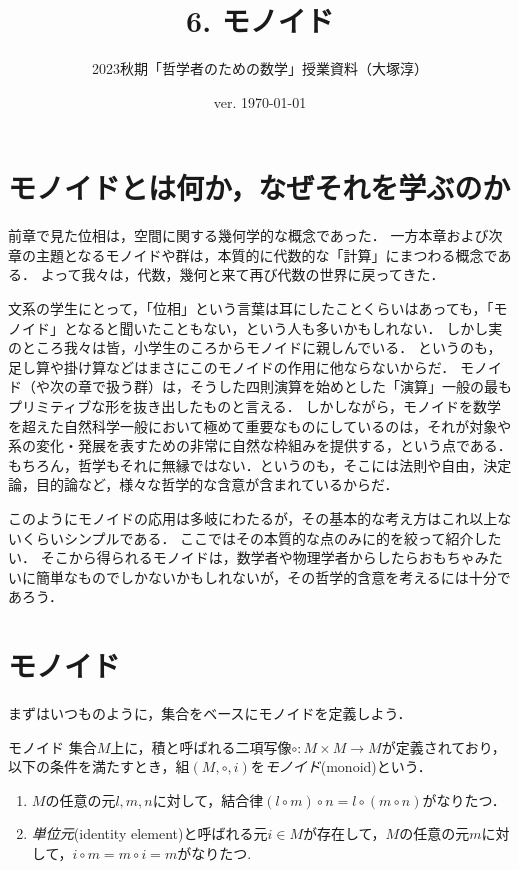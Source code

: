 \documentclass[11pt,a4paper, dvipdfmx]{jsarticle}
\begin{document}
\title{6. モノイド}
\author{2023秋期「哲学者のための数学」授業資料（大塚淳）}
\date{ver. \today}
\maketitle

\section{モノイドとは何か，なぜそれを学ぶのか}
前章で見た位相は，空間に関する幾何学的な概念であった．
一方本章および次章の主題となるモノイドや群は，本質的に代数的な「計算」にまつわる概念である．
よって我々は，代数，幾何と来て再び代数の世界に戻ってきた．

文系の学生にとって，「位相」という言葉は耳にしたことくらいはあっても，「モノイド」となると聞いたこともない，という人も多いかもしれない．
しかし実のところ我々は皆，小学生のころからモノイドに親しんでいる．
というのも，足し算や掛け算などはまさにこのモノイドの作用に他ならないからだ．
モノイド（や次の章で扱う群）は，そうした四則演算を始めとした「演算」一般の最もプリミティブな形を抜き出したものと言える．
しかしながら，モノイドを数学を超えた自然科学一般において極めて重要なものにしているのは，それが対象や系の変化・発展を表すための非常に自然な枠組みを提供する，という点である．
もちろん，哲学もそれに無縁ではない．というのも，そこには法則や自由，決定論，目的論など，様々な哲学的な含意が含まれているからだ．

このようにモノイドの応用は多岐にわたるが，その基本的な考え方はこれ以上ないくらいシンプルである．
ここではその本質的な点のみに的を絞って紹介したい．
そこから得られるモノイドは，数学者や物理学者からしたらおもちゃみたいに簡単なものでしかないかもしれないが，その哲学的含意を考えるには十分であろう．

\section{モノイド}
まずはいつものように，集合をベースにモノイドを定義しよう．

\begin{dfn}{モノイド}
集合$M$上に，積と呼ばれる二項写像$\circ: M \times M \to M$が定義されており，以下の条件を満たすとき，組$(M, \circ, i)$を\emph{モノイド}(monoid)という．
\begin{enumerate}
 \item $M$の任意の元$l, m, n$に対して，結合律$(l \circ m) \circ n = l \circ (m \circ n)$がなりたつ．
 \item \emph{単位元}(identity element)と呼ばれる元$i \in M$が存在して，$M$の任意の元$m$に対して，$i \circ m = m \circ i = m$がなりたつ.
\end{enumerate} 
\end{dfn}
\end{document}
